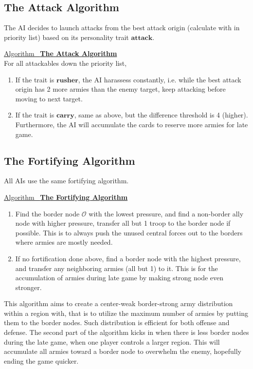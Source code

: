 \documentclass[12pt]{article}  %
\newcommand{\algtitle}[1]{\underline{Algorithm \ {\bf #1}} \vspace*{1mm}\\}
\begin{document}
\subsection{The Attack Algorithm}
The AI decides to launch attacks from the best attack origin (calculate with in priority list) based on its personality trait $\textbf{attack}$.

\algtitle{The Attack Algorithm}
For all attackables down the priority list,
\begin{enumerate}
	\item If the trait is $\textbf{rusher}$, the AI harassess constantly, i.e. while the best attack origin has 2 more armies than the enemy target, keep attacking before moving to next target.
	\item If the trait is $\textbf{carry}$, same as above, but the difference threshold is 4 (higher). Furthermore, the AI will accumulate the cards to reserve more armies for late game.
\end{enumerate}








\subsection{The Fortifying Algorithm}
All AIs use the same fortifying algorithm.

\algtitle{The Fortifying Algorithm}

\begin{enumerate}
	\item Find the border node $\mathcal{O}$ with the lowest pressure, and find a non-border ally node with higher pressure, transfer all but 1 troop to the border node if possible. This is to always push the unused central forces out to the borders where armies are mostly needed.
	\item If no fortification done above, find a border node with the highest pressure, and transfer any neighboring armies (all but 1) to it. This is for the accumulation of armies during late game by making strong node even stronger.
\end{enumerate}


This algorithm aims to create a center-weak border-strong army distribution within a region with, that is to utilize the maximum number of armies by putting them to the border nodes. Such distribution is efficient for both offense and defense. The second part of the algorithm kicks in when there is less border nodes during the late game, when one player controls a larger region. This will accumulate all armies toward a border node to overwhelm the enemy, hopefully ending the game quicker.
\end{document}
